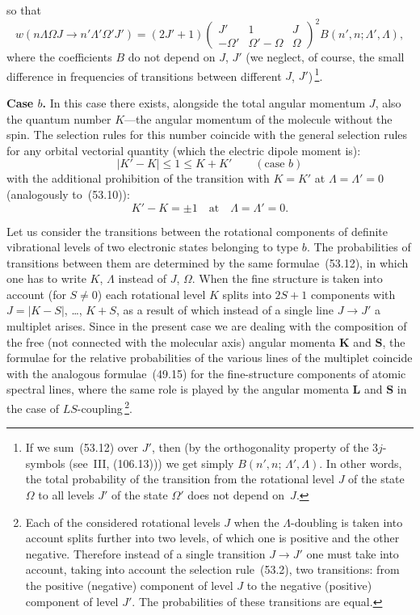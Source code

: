 so that
\begin{equation}
w(n\Lambda\Omega J \to n'\Lambda'\Omega'J') = (2J'+1)\begin{pmatrix} J' & 1 & J \\ -\Omega' & \Omega'-\Omega & \Omega\end{pmatrix}^{\!2}B(n',n;\Lambda',\Lambda),
\tag{53.12}
\end{equation}
where the coefficients $B$ do not depend on $J$, $J'$ (we neglect, of course, the small difference in frequencies of transitions between different $J$, $J'$)\,\footnote{If we sum~(53.12) over $J'$, then (by the orthogonality property of the $3j$-symbols (see~III, (106.13))) we get simply $B(n',n;\,\Lambda',\Lambda)$. In other words, the total probability of the transition from the rotational level $J$ of the state $\Omega$ to all levels $J'$ of the state $\Omega'$ does not depend on~$J$.}.

\textbf{Case $b$.} In this case there exists, alongside the total angular momentum $J$, also the quantum number $K$---the angular momentum of the molecule without the spin. The selection rules for this number coincide with the general selection rules for any orbital vectorial quantity (which the electric dipole moment is):
\begin{equation}
|K' - K| \leqslant 1 \leqslant K + K'\qquad (\text{case } b)
\tag{53.13}
\end{equation}
with the additional prohibition of the transition with $K = K'$ at $\Lambda = \Lambda' = 0$ (analogously to~(53.10)):
\begin{equation}
K' - K = \pm 1\quad\text{at}\quad \Lambda = \Lambda' = 0.
\tag{53.14}
\end{equation}

Let us consider the transitions between the rotational components of definite vibrational levels of two electronic states belonging to type $b$. The probabilities of transitions between them are determined by the same formulae~(53.12), in which one has to write $K$, $\Lambda$ instead of $J$, $\Omega$. When the fine structure is taken into account (for $S \neq 0$) each rotational level $K$ splits into $2S + 1$ components with $J = |K - S|$, \ldots, $K + S$, as a result of which instead of a single line $J \to J'$ a multiplet arises. Since in the present case we are dealing with the composition of the free (not connected with the molecular axis) angular momenta $\mathbf{K}$ and $\mathbf{S}$, the formulae for the relative probabilities of the various lines of the multiplet coincide with the analogous formulae~(49.15) for the fine-structure components of atomic spectral lines, where the same role is played by the angular momenta $\mathbf{L}$ and $\mathbf{S}$ in the case of $LS$-coupling\,\footnote{Each of the considered rotational levels $J$ when the $\Lambda$-doubling is taken into account splits further into two levels, of which one is positive and the other negative. Therefore instead of a single transition $J \to J'$ one must take into account, taking into account the selection rule~(53.2), two transitions: from the positive (negative) component of level $J$ to the negative (positive) component of level $J'$. The probabilities of these transitions are equal.}.

